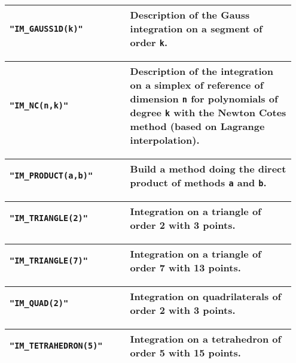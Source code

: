 \begin{center} \begin{tabular}{|m{0.4\linewidth}|m{0.55\linewidth}|} \hline
{\tt "IM\_GAUSS1D(k)" } & Description of the Gauss integration on a segment of order {\tt k}. \\ \hline
\end{tabular}  
\begin{tabular}{|m{0.4\linewidth}|m{0.55\linewidth}|} \hline
{\tt "IM\_NC(n,k)"} & Description of the integration on a simplex of reference of dimension {\tt n} for polynomials of degree {\tt k} with the Newton Cotes method (based on Lagrange interpolation).\\ \hline
\end{tabular}  
\begin{tabular}{|m{0.4\linewidth}|m{0.55\linewidth}|} \hline
{\tt "IM\_PRODUCT(a,b)"} & Build a method doing the direct product of methods {\tt a} and {\tt b}. \\ \hline
\end{tabular}  
\begin{tabular}{|m{0.4\linewidth}|m{0.55\linewidth}|} \hline
{\tt "IM\_TRIANGLE(2)"} & Integration on a triangle of order 2 with 3 points. \\ \hline
\end{tabular}
\begin{tabular}{|m{0.4\linewidth}|m{0.55\linewidth}|} \hline
{\tt "IM\_TRIANGLE(7)"} & Integration on a triangle of order 7 with 13 points. \\ \hline
\end{tabular} 
\begin{tabular}{|m{0.4\linewidth}|m{0.55\linewidth}|} \hline
{\tt "IM\_QUAD(2)"} & Integration on quadrilaterals of order 2 with 3 points. \\ \hline
\end{tabular}
\begin{tabular}{|m{0.4\linewidth}|m{0.55\linewidth}|} \hline
{\tt "IM\_TETRAHEDRON(5)"} & Integration on a tetrahedron of order 5 with 15 points. \\ \hline
\end{tabular} \end{center}
